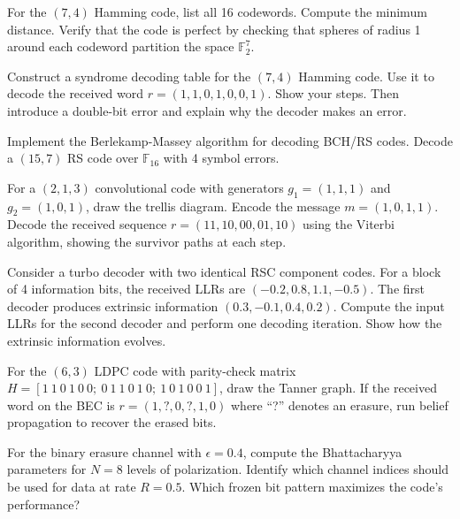 \begin{exercise}[Basic]
For the $(7,4)$ Hamming code, list all 16 codewords. Compute the minimum distance. Verify that the code is perfect by checking that spheres of radius 1 around each codeword partition the space $\mathbb{F}_2^7$.
\end{exercise}

\begin{exercise}[Basic]
Construct a syndrome decoding table for the $(7,4)$ Hamming code. Use it to decode the received word $r = (1,1,0,1,0,0,1)$. Show your steps. Then introduce a double-bit error and explain why the decoder makes an error.
\end{exercise}

\begin{exercise}[Intermediate]
Implement the Berlekamp-Massey algorithm for decoding BCH/RS codes. Decode a $(15,7)$ RS code over $\mathbb{F}_{16}$ with 4 symbol errors.
\end{exercise}

\begin{exercise}[Intermediate]
For a $(2,1,3)$ convolutional code with generators $g_1 = (1,1,1)$ and $g_2 = (1,0,1)$, draw the trellis diagram. Encode the message $m = (1,0,1,1)$. Decode the received sequence $r = (11, 10, 00, 01, 10)$ using the Viterbi algorithm, showing the survivor paths at each step.
\end{exercise}

\begin{exercise}[Intermediate]
Consider a turbo decoder with two identical RSC component codes. For a block of 4 information bits, the received LLRs are $(-0.2, 0.8, 1.1, -0.5)$. The first decoder produces extrinsic information $(0.3, -0.1, 0.4, 0.2)$. Compute the input LLRs for the second decoder and perform one decoding iteration. Show how the extrinsic information evolves.
\end{exercise}

\begin{exercise}[Intermediate]
For the $(6,3)$ LDPC code with parity-check matrix $H = [1\ 1\ 0\ 1\ 0\ 0;\ 0\ 1\ 1\ 0\ 1\ 0;\ 1\ 0\ 1\ 0\ 0\ 1]$, draw the Tanner graph. If the received word on the BEC is $r = (1, ?, 0, ?, 1, 0)$ where ``?'' denotes an erasure, run belief propagation to recover the erased bits.
\end{exercise}

\begin{exercise}[Intermediate]
For the binary erasure channel with $\epsilon = 0.4$, compute the Bhattacharyya parameters for $N = 8$ levels of polarization. Identify which channel indices should be used for data at rate $R = 0.5$. Which frozen bit pattern maximizes the code's performance?
\end{exercise}


